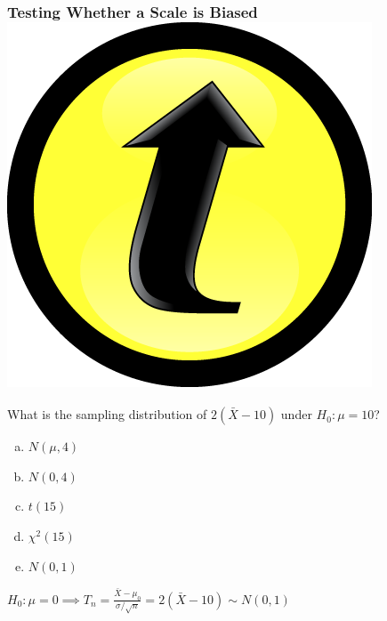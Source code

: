 \documentclass[handout]{beamer}
\begin{document}
\begin{frame}[t]

	\frametitle{Testing Whether a Scale is Biased \hfill \includegraphics[scale = 0.05]{./images/clicker}}

	\vspace{2em}

	What is the sampling distribution of $2(\bar{X}-10)$ under $H_0\colon \mu = 10$? 

	\vspace{1em}

	\begin{enumerate}[(a)]
		\item $N(\mu, 4)$  
		\item $N(0, 4)$  
		\item $t(15)$  
		\item $\chi^2(15)$  
		\item $N(0,1)$  
	\end{enumerate}

	\pause
	\alert{$H_0\colon \mu = 0 \implies \displaystyle T_n = \frac{\bar{X} - \mu_0}{\sigma/\sqrt{n}} =  2(\bar{X} - 10)\sim N(0,1)$}
\end{frame}
\end{document}

